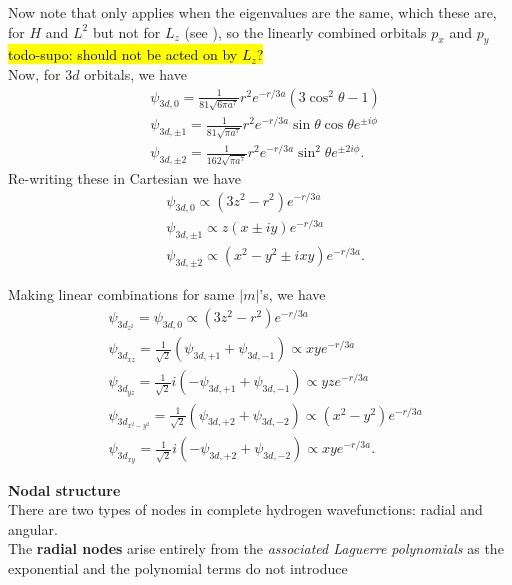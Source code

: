 Now note that  only applies when the eigenvalues are the same, which these are, for $H$ and $L^2$ but not for $L_z$ (see ), so the linearly combined orbitals $p_x$ and $p_y$ \hl{todo-supo: should not be acted on by $L_z$?}\\
Now, for $3d$ orbitals, we have 
\begin{equation}
\begin{aligned}
&\psi_{3d,0}=\frac{1}{81\sqrt{6\pi a^7}}r^2e^{-r/3a}(3\cos^2\theta-1)\\
&\psi_{3d,\pm1}=\frac{1}{81\sqrt{\pi a^7}}r^2e^{-r/3a}\sin\theta\cos\theta e^{\pm i\phi}\\
&\psi_{3d,\pm2}=\frac{1}{162\sqrt{\pi a^7}}r^2e^{-r/3a}\sin^2\theta e^{\pm 2i\phi}. 
\end{aligned}
\end{equation}
Re-writing these in Cartesian we have
\begin{subequations}
\begin{align}
&\psi_{3d,0}\propto(3z^2-r^2)e^{-r/3a}\\
&\psi_{3d,\pm1}\propto z(x\pm iy)e^{-r/3a}\\
&\psi_{3d,\pm2}\propto (x^2- y^2\pm ixy)e^{-r/3a}. 
\end{align}
\end{subequations}
\begin{defi}
Making linear combinations for same $|m|$'s, we have
\begin{subequations}
\begin{align}
&\psi_{3d_{z^2}}=\psi_{3d,0}\propto(3z^2-r^2)e^{-r/3a} \\
&\psi_{3d_{xz}}=\frac{1}{\sqrt{2}}(\psi_{3d,+1}+\psi_{3d,-1})\propto xye^{-r/3a}\\
&\psi_{3d_{yz}}=\frac{1}{\sqrt{2}}i(-\psi_{3d,+1}+\psi_{3d,-1})\propto yze^{-r/3a}\\
&\psi_{3d_{x^2-y^2}}=\frac{1}{\sqrt{2}}(\psi_{3d,+2}+\psi_{3d,-2})\propto(x^2-y^2)e^{-r/3a}\\
&\psi_{3d_{xy}}=\frac{1}{\sqrt{2}}i(-\psi_{3d,+2}+\psi_{3d,-2})\propto xye^{-r/3a}.
\end{align}
\end{subequations}
\end{defi}
\textbf{Nodal structure}\\
There are two types of nodes in complete hydrogen wavefunctions: radial and angular. \\
The \textbf{radial nodes} arise entirely from the \textit{associated 
Laguerre polynomials} as the exponential and the polynomial terms do not introduce 
